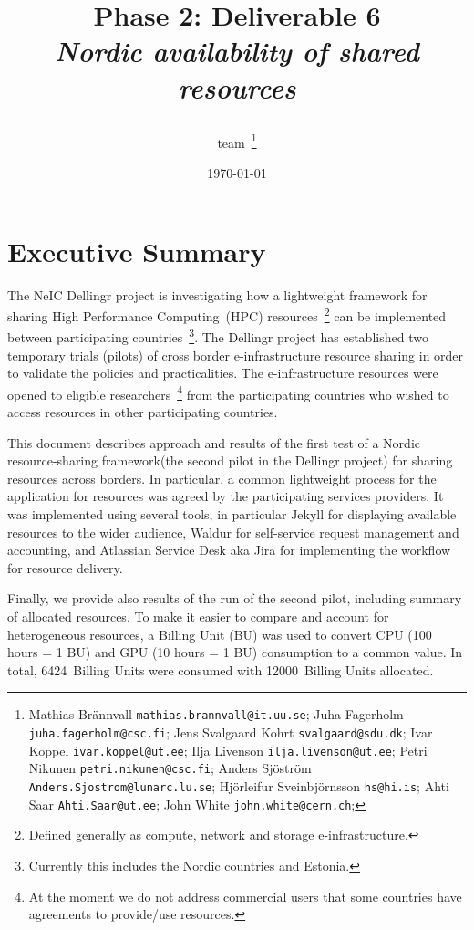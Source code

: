 \documentclass{article}
\title{
{\bf \dell Phase 2: Deliverable 6} \\
{\it Nordic availability of shared resources}
\author{\dell team~\footnote{ %
Mathias Br{\"a}nnvall {\tt mathias.brannvall@it.uu.se};
Juha Fagerholm {\tt juha.fagerholm@csc.fi};
Jens Svalgaard Kohrt {\tt svalgaard@sdu.dk};
Ivar Koppel {\tt ivar.koppel@ut.ee};
Ilja Livenson {\tt ilja.livenson@ut.ee};
Petri Nikunen {\tt petri.nikunen@csc.fi};
Anders Sj{\"o}str{\"o}m {\tt Anders.Sjostrom@lunarc.lu.se};
Hj{\"o}rleifur Sveinbj{\"o}rnsson {\tt hs@hi.is};
Ahti Saar {\tt Ahti.Saar@ut.ee};
John White {\tt john.white@cern.ch};
}}}
\date{\today}
\newcommand{\dell}{Dellingr\xspace}
\newcommand{\einfra}{e-infrastructure\xspace}
\newcommand{\pilot}{first test of a Nordic resource-sharing framework\xspace}
\newcommand{\BUcons}{6424\xspace}
\newcommand{\BUalloc}{12000\xspace} %
\begin{document}
\pagestyle{fancy}
\lhead{{\bf \dell Project}}

\maketitle

\newpage
\tableofcontents
\newpage

\section{Executive Summary}
\label{sec-exec-summ}

The NeIC \dell project is investigating how a lightweight framework for sharing High Performance Computing~(HPC) resources~\footnote{Defined generally as compute, network and storage \einfra.} can be implemented between participating countries~\footnote{Currently this includes the Nordic countries and Estonia.}.
The \dell project has established two temporary trials (pilots) of cross border \einfra resource sharing in order to validate the policies and practicalities. 
The \einfra resources were opened to eligible researchers~\footnote{At the moment we do not address commercial users that some countries have agreements to provide/use resources.} from the participating countries who wished to access resources in other participating countries.

This document describes approach and results of the \pilot (the second pilot in the \dell project)
for sharing resources across borders. 
In particular, a common lightweight process for the application for resources was agreed by the participating services providers. 
It was implemented using several tools, in particular Jekyll for displaying available resources to the wider audience, Waldur for self-service request management and accounting, and Atlassian Service Desk aka Jira for implementing the workflow for resource delivery.

Finally, we provide also results of the run of the second pilot, including summary of allocated resources. 
To make it easier to compare and account for heterogeneous resources, a Billing Unit (BU) was used to convert CPU (100 hours = 1 BU) and GPU (10 hours = 1 BU) consumption to a common value. 
In total, \BUcons~Billing Units were consumed with \BUalloc~Billing Units allocated.
\end{document}

